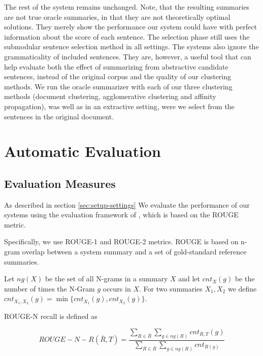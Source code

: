 \documentclass[a4paper,BCOR=10mm]{report}
\numberwithin{lemma}{chapter}
\numberwithin{definition}{chapter}
\begin{document}
The rest of the system remains unchanged. Note, that the resulting summaries are not true oracle summaries, in that they are not theoretically optimal solutions. They merely show the performance our system could have with perfect information about the score of each sentence. The selection phase still uses the submodular sentence selection method in all settings. The systems also ignore the grammaticality of included sentences.
They are, however, a useful tool that can help evaluate both the effect of summarizing from abstractive candidate sentences, instead of the original corpus and the quality of our clustering methods.
We run the oracle summarizer with each of our three clustering methods (document clustering, agglomerative clustering and affinity propagation), was well as in an extractive setting, were we select from the sentences in the original document.

\chapter{Automatic Evaluation} \label{sec:results-auto}

\section{Evaluation Measures} \label{sec:evaluation-auto-setup}

As described in section \ref{sec:setup-settings}
We evaluate the performance of our systems using the evaluation framework of \citet{tilse}, which is based on the ROUGE \citep{rouge} metric.

Specifically, we use ROUGE-1 and ROUGE-2 metrics.
ROUGE is based on n-gram overlap between a system summary and a set of gold-standard reference summaries.

Let $\mathit{ng}(X)$ be the set of all N-grams in a summary $X$ and let $\mathit{cnt}_{X}(g)$ be the number of times the N-Gram $g$ occurs in $X$.
For two summaries $X_1, X_2$ we define $\mathit{cnt}_{X_1, X_2}(g) = \min\{  \mathit{cnt}_{X_1}(g),  \mathit{cnt}_{X_2}(g) \}$.

ROUGE-N recall is defined as

\begin{equation}
    \mathit{ROUGE-N-R}(\bar{R}, T) =  \frac{
        \sum_{R \in \bar{R}}
        \sum_{g \in \mathit{ng}(R)}
        \mathit{cnt}_{R,T}(g)
    } {
        \sum_{R \in \bar{R}}
        \sum_{g \in \mathit{ng}(R)}
        \mathit{cnt}_{R(g)}
    }
\end{equation}
\end{document}
